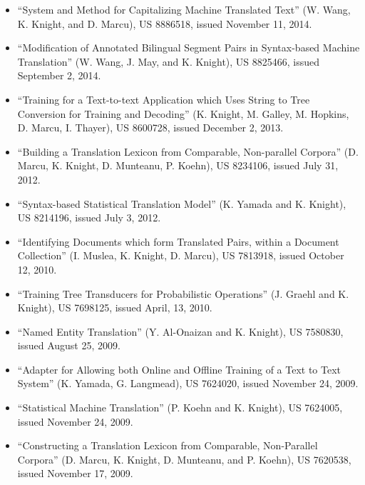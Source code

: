 {}

\begin{itemize}
\item ``System and Method for Capitalizing Machine Translated Text'' (W. Wang, K. Knight, and D. Marcu), 
US 8886518, issued November 11, 2014.

\item ``Modification of Annotated Bilingual Segment Pairs in Syntax-based Machine Translation'' (W. Wang, J. May, and K. Knight), 
US 8825466, issued September 2, 2014.

\item ``Training for a Text-to-text Application which Uses String to Tree Conversion for Training and Decoding'' (K. Knight, M. Galley, M. Hopkins, D. Marcu, I. Thayer), 
US 8600728, issued December 2, 2013.

\item ``Building a Translation Lexicon from Comparable, Non-parallel Corpora'' (D. Marcu, K. Knight, D. Munteanu, P. Koehn), 
US 8234106, issued July 31, 2012. 

\item ``Syntax-based Statistical Translation Model'' (K. Yamada and K. Knight),
US 8214196, issued July 3, 2012. 

\item ``Identifying Documents which form Translated Pairs, within a Document Collection'' (I. Muslea, K. Knight, D. Marcu),
US 7813918, issued October 12, 2010.

\item ``Training Tree Transducers for Probabilistic Operations'' (J. Graehl and K. Knight),
US 7698125, issued April, 13, 2010.

\item ``Named Entity Translation'' (Y. Al-Onaizan and K. Knight),
US 7580830, issued August 25, 2009.

\item ``Adapter for Allowing both Online and Offline Training of a
Text to Text System'' (K. Yamada, G. Langmead),
US 7624020, issued November 24, 2009.

\item ``Statistical Machine Translation'' (P. Koehn and K. Knight),
US 7624005, issued November 24, 2009.

\item ``Constructing a Translation Lexicon from Comparable, Non-Parallel
Corpora'' (D. Marcu, K. Knight, D. Munteanu, and P. Koehn),
US 7620538, issued November 17, 2009.


\end{itemize}
